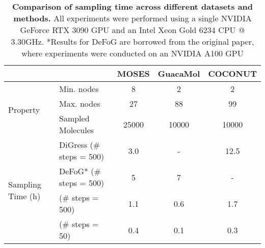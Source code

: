 \begin{table}[h!]
\centering
{
\begin{tabular}{l|l|ccc}
\toprule
& & MOSES & GuacaMol & COCONUT \\
\midrule
\multirow{3}{*}{Property} & Min. nodes         & 8   & 2   & 2   \\
& Max. nodes         & 27  & 88  & 99  \\
& Sampled Molecules & 25000  & 10000  & 10000  \\
\midrule
\multirow{4}{*}{Sampling Time (h)} & DiGress (\# steps = 500) & 3.0 & - & 12.5 \\
& DeFoG* (\# steps = 500) & 5 & 7 & - \\
& \methodname{} (\# steps = 500) & 1.1 & 0.6 & 1.7 \\
& \methodname{} (\# steps = 50) & 0.4 & 0.1 & 0.3 \\
\bottomrule
\end{tabular}
}
\caption{\textbf{Comparison of sampling time across different datasets and methods.} All experiments were performed using a single NVIDIA GeForce RTX 3090 GPU and an Intel Xeon Gold 6234 CPU @ 3.30GHz. *Results for DeFoG are borrowed from the original paper, where experiments were conducted on an NVIDIA A100 GPU}
\label{tab:sampling_time}
\end{table}
